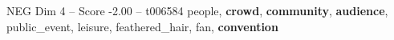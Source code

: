 \begin{textsample}{NEG Dim 4 – Score -2.00 – t006584}  \label{ex:f4_neg_038}
people, \textbf{crowd}, \textbf{community}, \textbf{audience}, public\_event, leisure, feathered\_hair, fan, \textbf{convention}

\end{textsample}
